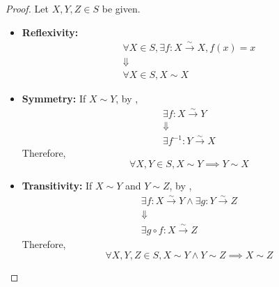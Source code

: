 \begin{proof}
    Let $X, Y, Z \in S$ be given.
    \begin{itemize}
        \item \textbf{Reflexivity:}
        \[
        \begin{array}{c}
            \forall X \in S, \exists f: X \xrightarrow{\sim} X, f(x) = x \\
            \Downarrow \\
            \forall X \in S, X \sim X
        \end{array}
        \]
        \item \textbf{Symmetry:} If $X \sim Y$, by ,
        \[
        \begin{array}{c}
            \exists f: X \xrightarrow{\sim} Y \\
            \Downarrow \\
            \exists f^{-1}: Y \xrightarrow{\sim} X
        \end{array}
        \]
        Therefore,
        \[
        \forall X, Y \in S, X \sim Y \implies Y \sim X
        \]
        \item \textbf{Transitivity:} If $X \sim Y$ and $Y \sim Z$, by ,
        \[
        \begin{array}{c}
            \exists f: X \xrightarrow{\sim} Y \land \exists g: Y \xrightarrow{\sim} Z \\
            \Downarrow \\
            \exists g \circ f: X \xrightarrow{\sim} Z
        \end{array}
        \]
        Therefore,
        \[
        \forall X, Y, Z \in S, X \sim Y \land Y \sim Z \implies X \sim Z
        \]
    \end{itemize}
\end{proof}
